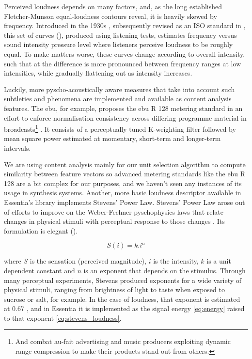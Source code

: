 {{Perceived loudness depends on many factors, and, as the long established  Fletcher-Munson equal-loudness contours reveal, it is heavily skewed by frequency. Introduced in the 1930s \citep{Fletcher1933}, subsequently revised as an ISO standard in \cite{countours}, this set of curves (), produced using listening tests, estimates frequency versus sound intensity pressure level where listeners perceive loudness to be roughly equal. To make matters worse, these curves change according to overall intensity, such that at  the difference is more pronounced between frequency ranges at low intensities, while gradually flattening out as intensity increases.

Luckily, more pyscho-acoustically aware measures that take into account such subtleties and phenomena are implemented and available as content analysis features. The \acrfull{ebu}, for example, proposes the \acrshort{ebu} R 128 metering standard in an effort to enforce normalisation consistency across differing programme material in broadcasts\footnote{And combat au-fait advertising and music producers exploiting dynamic range compression to make their products stand out from others.} \citep{ebu, Lerch2012}. It consists of a perceptually tuned K-weighting filter followed by mean square power estimated at momentary, short-term and longer-term intervals.

We are using content analysis mainly for our unit selection algorithm to compute similarity between feature vectors so advanced metering standards like the \acrshort{ebu} R 128 are a bit complex for our purposes, and we haven't seen any instances of its usage in synthesis systems. Another, more basic loudness descriptor available in Essentia's library implements Stevens' Power Law. Stevens' Power Law arose out of efforts to improve on the Weber-Fechner pyschophysics laws that relate changes in physical stimuli with perceptual response to those changes \citep{Stevens1975, Reiss2001}. Its formulation is elegant ().

\begin{equation}
\label{eq:stevens}
S(i)=k.i^{n}
\end{equation}

where $S$ is the sensation (perceived magnitude), $i$ is the intensity, $k$ is a unit dependent constant and $n$ is an exponent that depends on the stimulus. Through many perceptual experiments, Stevens produced exponents for a wide variety of physical stimuli, ranging from brightness of light to taste when exposed to sucrose or salt, for example. In the case of loudness, that exponent is estimated at 0.67 \citep{Stevens1975}, and in Essentia it is implemented as the signal energy \eqref{eq:energy} raised to that exponent \eqref{eq:stevens_loudness}.

}}
